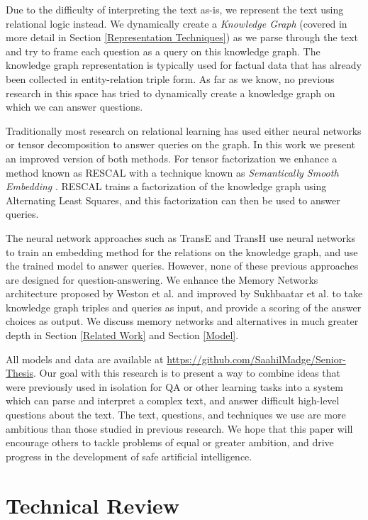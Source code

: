 \documentclass[pageno]{final_paper}
\begin{document}
Due to the difficulty of interpreting the text as-is, we represent the text
using relational logic instead. We dynamically create a \textit{Knowledge Graph}
(covered in more detail in Section \ref{Representation Techniques}) as we parse
through the text and try to frame each question as a query on this knowledge
graph. The knowledge graph representation is typically used for factual data
that has already been collected in entity-relation triple form. As far as we
know, no previous research in this space has tried to dynamically create a
knowledge graph on which we can answer questions.

Traditionally most research on relational learning has used either neural
networks or tensor decomposition to answer queries on the graph. In this work we
present an improved version of both methods. For tensor factorization we enhance
a method known as RESCAL \cite{Bader2007, Nickel2011} with a technique known as
\textit{Semantically Smooth Embedding} \cite{Guo2015}. RESCAL trains a
factorization of the knowledge graph using Alternating Least Squares, and this
factorization can then be used to answer queries.

The neural network approaches such as TransE \cite{Bordes2013} and TransH
\cite{Wang2014} use neural networks to train an embedding method for the
relations on the knowledge graph, and use the trained model to answer queries.
However, none of these previous approaches are designed for question-answering.
We enhance the Memory Networks architecture proposed by Weston et al.
\cite{Weston2015a} and improved by Sukhbaatar et al. \cite{Sukhbaatar2015} to
take knowledge graph triples and queries as input, and provide a scoring of the
answer choices as output. We discuss memory networks and alternatives in much
greater depth in Section \ref{Related Work} and Section \ref{Model}.

All models and data are available at
\url{https://github.com/SaahilMadge/Senior-Thesis}. Our goal with this research
is to present a way to combine ideas that were previously used in isolation for
QA or other learning tasks into a system which can parse and interpret a complex
text, and answer difficult high-level questions about the text. The text,
questions, and techniques we use are more ambitious than those studied in
previous research. We hope that this paper will encourage others to tackle
problems of equal or greater ambition, and drive progress in the development of
safe artificial intelligence.

\section{Technical Review}
\label{Technical Review}
\end{document}
